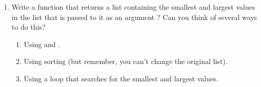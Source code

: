 \documentclass[letterpaper,10pt,english]{sphinxmanual}
\begin{document}
\begin{enumerate}
\begin{sphinxVerbatim}[commandchars=\\\{\}]
\end{sphinxVerbatim}

\item {} 
Write a function that returns a list containing the smallest and
largest values in the list that is passed to it as an argument
? Can you think of several ways to do
this?
\begin{enumerate}
\def\theenumii{\arabic{enumii}}
\def\labelenumii{\theenumii .}
\makeatletter\def\p@enumiii{\p@enumii \theenumii .}\makeatother
\item {} 
Using  and .

\item {} 
Using sorting (but remember, you can’t change the original list).

\item {} 
Using a  loop that searches for the smallest and largest
values.

\end{enumerate}

\end{enumerate}
\end{document}

